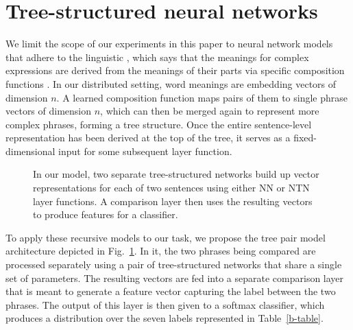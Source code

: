 
\section{Tree-structured neural networks} \label{methods}

We limit the scope of our experiments in this paper to neural network models 
that adhere to the linguistic , which says that the meanings for complex
expressions are derived from the meanings of their parts
via specific composition functions \cite{Partee84,Janssen97}. In our
distributed setting, word meanings are embedding vectors of dimension $n$. A learned
composition function maps pairs of them to single phrase vectors of dimension $n$, 
which can then be merged again to represent more complex
phrases, forming a tree structure. Once the entire sentence-level representation has been
derived at the top of the tree, it serves as a fixed-dimensional input for some subsequent layer function.

\begin{figure}[tp]
  \centering
  
  \caption{In our model, two separate tree-structured networks build up vector representations for each of two sentences using either NN or NTN layer functions. A comparison layer then uses the resulting vectors to produce features for a classifier.} 
  \label{sample-figure}
\end{figure}

To apply these recursive models to our task, we propose the tree 
pair model architecture depicted in Fig.~\ref{sample-figure}. 
In it, the two phrases being compared are processed separately using a pair 
of tree-structured networks that share a single set of parameters. 
The resulting vectors are fed into a separate comparison
layer that is meant to generate a feature vector capturing the
label between the two phrases. The output of this layer is then
given to a softmax classifier, which produces a
distribution over the seven labels represented in Table~\ref{b-table}.

